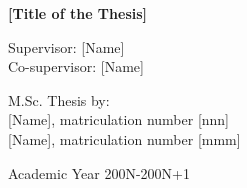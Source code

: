 {\begin{center}
\vspace{1cm} 
\LARGE
\textbf{[Title of the Thesis]}\\


\vspace{2.0cm}

\end{center}


\vspace{3.0cm} 
\large
\begin{flushleft}
Supervisor: [Name]   \\
Co-supervisor:  [Name]
\end{flushleft}

\vspace{1.0cm}

\begin{flushright}
M.Sc. Thesis by: \\ 
{[Name]}, matriculation number [nnn] \\ 
{[Name]}, matriculation number [mmm] \\
\end{flushright}

\vspace{2cm}

\begin{center}
Academic Year 200N-200N+1
\end{center} 

\clearpage
}
